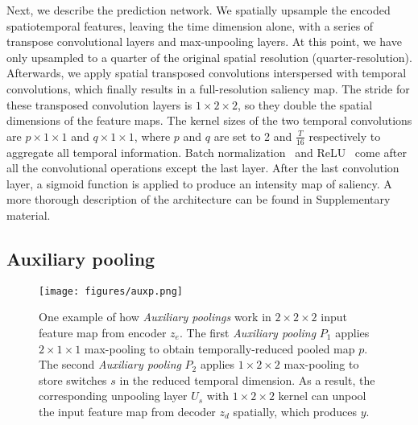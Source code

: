 \documentclass[10pt,twocolumn,letterpaper]{article}
\newcommand{\auxpnamet}{Auxiliary pooling}
\newcommand{\auxpname}{\textit{\auxpnamet}}
\begin{document}
Next, we describe the prediction network. We spatially upsample the encoded spatiotemporal features, leaving the time dimension alone, with a series of transpose convolutional layers and max-unpooling layers. At this point, we have only upsampled to a quarter of the original spatial resolution (quarter-resolution). Afterwards, we apply spatial transposed convolutions interspersed with temporal convolutions, which finally results in a full-resolution saliency map. The stride for these transposed convolution layers is $1\times 2\times 2$, so they double the spatial dimensions of the feature maps. The kernel sizes of the two temporal convolutions are $p\times 1\times 1$ and $q\times 1\times 1$, where $p$ and $q$ are set to 2 and $\frac{T}{16}$ respectively to aggregate all temporal information. Batch normalization~\cite{ioffe2015batch} and ReLU~\cite{nair2010rectified} come after all the convolutional operations except the last layer. After the last convolution layer, a sigmoid function is applied to produce an intensity map of saliency. A more thorough description of the architecture can be found in Supplementary material.

\subsection{\auxpnamet{}} \label{subsec:auxp}

\begin{figure}[!ht]
  \centering
  \texttt{[image: figures/auxp.png]}
  \caption{One example of how \auxpname{\textit{s}} work in $2\times 2\times 2$ input feature map from encoder $z_e$. The first \auxpname{} $P_1$ applies $2\times 1\times 1$ max-pooling to obtain temporally-reduced pooled map $p$. The second \auxpname{} $P_2$ applies $1\times 2\times 2$ max-pooling to store switches $s$ in the reduced temporal dimension. As a result, the corresponding unpooling layer $U_s$ with $1\times 2\times 2$ kernel can unpool the input feature map from decoder $z_d$ spatially, which produces $y$.}
  \label{fig:auxp}
\end{figure}
\end{document}
